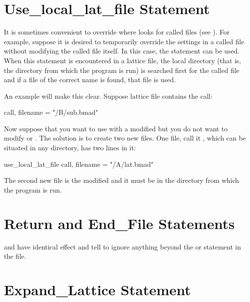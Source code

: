 {{{%
\section{Use_local_lat_file Statement}
\label{s:use.loc}

It is sometimes convenient to override where \bmad looks for called
files (see ). For example, suppose it is desired to
temporarily override the settings in a called file without modifying
the called file itself. In this case, the 
statement can be used. When this statement is encountered in a lattice
file, the local directory (that is, the directory from which the
program is run) is searched first for the called file and if a file
of the correct name is found, that file is used.

An example will make this clear. Suppose lattice file 
contains the call:
\begin{example}
  call, filename = "/B/sub.bmad"
\end{example}
Now suppose that you want to use  with a modified
 but you do not want to modify  or
. The solution is to create two new files. One file,
call it , which can be situated in any directory, has two
lines in it:
\begin{example}
  use_local_lat_file
  call, filename = "/A/lat.bmad"
\end{example}
The second new file is the modified  and it must be in the
directory from which the program is run.

\section{Return and End_File Statements}

 and  have identical effect and tell \bmad to
ignore anything beyond the  or  statement in
the file.

\section{Expand_Lattice Statement}
\label{s:expand.lat}

}}}
